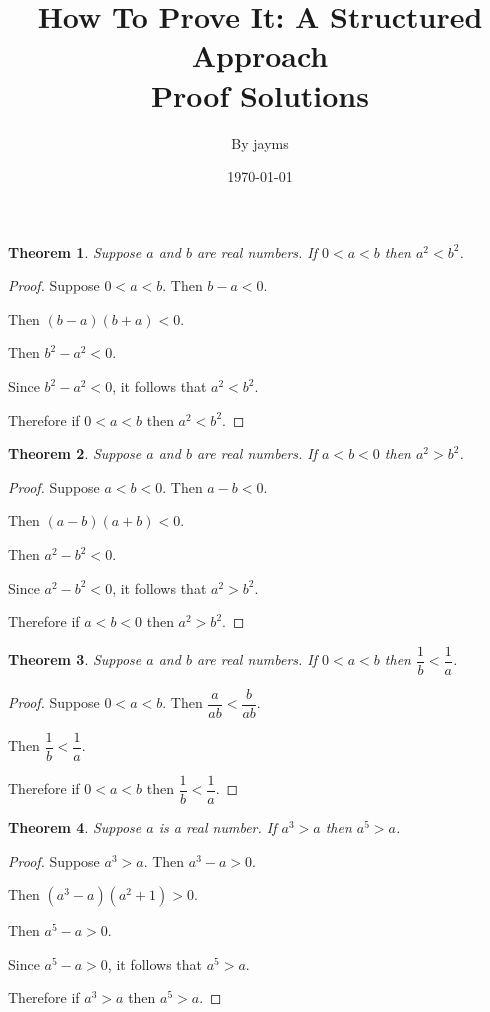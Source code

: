 \documentclass[14pt,a4paper]{extarticle}
\title{\textbf{How To Prove It: A Structured Approach \protect\\ Proof Solutions}}
\author{By jayms}
\date{\today}
\newtheorem{theorem}{Theorem}
\begin{document}
\maketitle
\newpage

\begin{theorem}
Suppose $a$ and $b$ are real numbers. If ${0 < a < b}$ then ${a^2 < b^2}$.
\end{theorem}

\begin{proof}
Suppose ${0 < a < b}$. Then ${b - a < 0}$.

Then ${(b - a)(b + a) < 0}$.

Then ${b^2 - a^2 < 0}$.

Since ${b^2 - a^2 < 0}$, it follows that ${a^2 < b^2}$.

Therefore if ${0 < a < b}$ then ${a^2 < b^2}$.
\end{proof}

\begin{theorem}
Suppose $a$ and $b$ are real numbers. If ${a < b < 0}$ then ${a^2 > b^2}$.
\end{theorem}

\begin{proof}
Suppose ${a < b< 0}$. Then ${a - b < 0}$.

Then ${(a - b)(a + b) < 0}$.

Then ${a^2 - b^2 < 0}$.

Since ${a^2 - b^2 < 0}$, it follows that ${a^2 > b^2}$.

Therefore if ${a < b < 0}$ then ${a^2 > b^2}$.
\end{proof}

\begin{theorem}
Suppose $a$ and $b$ are real numbers. If ${0 < a < b}$ then ${\dfrac{1}{b} < \dfrac{1}{a}}$.
\end{theorem}

\begin{proof}
Suppose ${0 < a < b}$. Then ${\dfrac{a}{ab} < \dfrac{b}{ab}}$.

Then ${\dfrac{1}{b} < \dfrac{1}{a}}$.

Therefore if ${0 < a < b}$ then ${\dfrac{1}{b} < \dfrac{1}{a}}$.
\end{proof}

\begin{theorem}
Suppose $a$ is a real number. If ${a^3 > a}$ then ${a^5 > a}$.
\end{theorem}

\begin{proof}
Suppose ${a^3 > a}$. Then ${a^3 - a > 0}$.

Then ${(a^3 - a)(a^2 + 1) > 0}$.

Then ${a^5 - a > 0}$.

Since ${a^5 - a > 0}$, it follows that ${a^5 > a}$.

Therefore if ${a^3 > a}$ then ${a^5 > a}$.
\end{proof}
\end{document}

